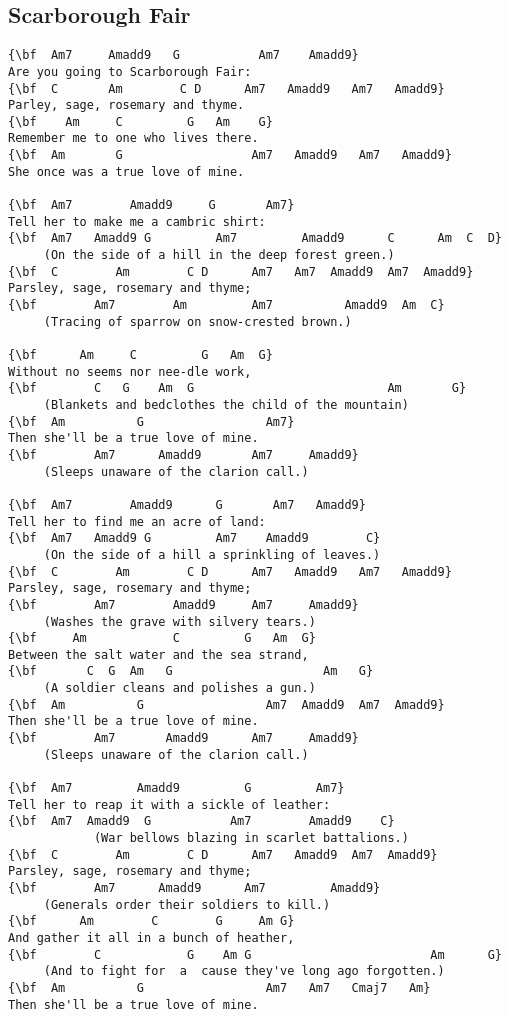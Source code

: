 \documentclass[a4paper]{article}
\begin{document}
\subsection{Scarborough Fair}
\begin{Verbatim}[commandchars=\\\{\}]
{\bf  Am7     Amadd9   G           Am7    Amadd9}
Are you going to Scarborough Fair:
{\bf  C       Am        C D      Am7   Amadd9   Am7   Amadd9}
Parley, sage, rosemary and thyme.
{\bf    Am     C         G   Am    G}
Remember me to one who lives there.
{\bf  Am       G                  Am7   Amadd9   Am7   Amadd9}
She once was a true love of mine.

{\bf  Am7        Amadd9     G       Am7}
Tell her to make me a cambric shirt:
{\bf  Am7   Amadd9 G         Am7         Amadd9      C      Am  C  D}
     (On the side of a hill in the deep forest green.)
{\bf  C        Am        C D      Am7   Am7  Amadd9  Am7  Amadd9}
Parsley, sage, rosemary and thyme;
{\bf        Am7        Am         Am7          Amadd9  Am  C}
     (Tracing of sparrow on snow-crested brown.)

{\bf      Am     C         G   Am  G}
Without no seems nor nee-dle work,
{\bf        C   G    Am  G                           Am       G}
     (Blankets and bedclothes the child of the mountain)
{\bf  Am          G                 Am7}
Then she'll be a true love of mine.
{\bf        Am7      Amadd9       Am7     Amadd9}
     (Sleeps unaware of the clarion call.)

{\bf  Am7        Amadd9      G       Am7   Amadd9}
Tell her to find me an acre of land:
{\bf  Am7   Amadd9 G         Am7    Amadd9        C}
     (On the side of a hill a sprinkling of leaves.)
{\bf  C        Am        C D      Am7   Amadd9   Am7   Amadd9}
Parsley, sage, rosemary and thyme;
{\bf        Am7        Amadd9     Am7     Amadd9}
     (Washes the grave with silvery tears.)
{\bf     Am            C         G   Am  G}
Between the salt water and the sea strand,
{\bf       C  G  Am   G                     Am   G}
     (A soldier cleans and polishes a gun.)
{\bf  Am          G                 Am7  Amadd9  Am7  Amadd9}
Then she'll be a true love of mine.
{\bf        Am7       Amadd9      Am7     Amadd9}
     (Sleeps unaware of the clarion call.)

{\bf  Am7         Amadd9         G         Am7}
Tell her to reap it with a sickle of leather:
{\bf  Am7  Amadd9  G           Am7        Amadd9    C}
            (War bellows blazing in scarlet battalions.)
{\bf  C        Am        C D      Am7   Amadd9  Am7  Amadd9}
Parsley, sage, rosemary and thyme;
{\bf        Am7      Amadd9      Am7         Amadd9}
     (Generals order their soldiers to kill.)
{\bf      Am        C        G     Am G}
And gather it all in a bunch of heather,
{\bf        C            G    Am G                         Am      G}
     (And to fight for  a  cause they've long ago forgotten.)
{\bf  Am          G                 Am7   Am7   Cmaj7   Am}
Then she'll be a true love of mine. 

\end{Verbatim}
\newpage
\end{document}
